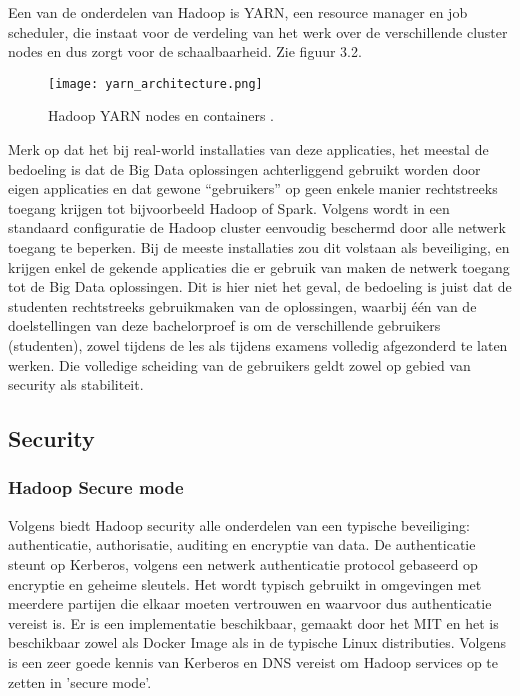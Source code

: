 Een van de onderdelen van Hadoop is YARN, een resource manager en job scheduler, die instaat voor de verdeling van het werk over de verschillende cluster nodes en dus zorgt voor de schaalbaarheid. Zie figuur 3.2.
\newline
\begin{figure}[H]
    \texttt{[image: yarn\_architecture.png]}
    \caption{Hadoop YARN nodes en containers \autocite{Hadoop2023d}.}
\end{figure}

Merk op dat het bij real-world installaties van deze applicaties, het meestal de bedoeling is dat de Big Data oplossingen achterliggend gebruikt worden door eigen applicaties en dat gewone ``gebruikers'' op geen enkele manier rechtstreeks toegang krijgen tot bijvoorbeeld Hadoop of Spark.
\newline
Volgens \autocite{Hadoop2023} wordt in een standaard configuratie de Hadoop cluster eenvoudig beschermd door alle netwerk toegang te beperken. 
Bij de meeste installaties zou dit volstaan als beveiliging, en krijgen enkel de gekende applicaties die er gebruik van maken de netwerk toegang tot de Big Data oplossingen.
\newline
\newline
Dit is hier niet het geval, de bedoeling is juist dat de studenten rechtstreeks gebruikmaken van de oplossingen, waarbij één van de doelstellingen van deze bachelorproef is om de verschillende gebruikers (studenten), zowel tijdens de les als tijdens examens volledig afgezonderd te laten werken. Die volledige scheiding van de gebruikers geldt zowel op gebied van security als stabiliteit.

\subsection{Security}

\subsubsection{Hadoop Secure mode}
Volgens \textcite{Kiran2022} biedt Hadoop security alle onderdelen van een typische beveiliging: authenticatie, authorisatie, auditing en encryptie van data.
De authenticatie steunt op Kerberos, volgens \textcite{Kerberos2023} een netwerk authenticatie protocol gebaseerd op encryptie en geheime sleutels. Het wordt typisch gebruikt in omgevingen met meerdere partijen die elkaar moeten vertrouwen en waarvoor dus authenticatie vereist is. Er is een implementatie beschikbaar, gemaakt door het MIT en het is beschikbaar zowel als Docker Image als in de typische Linux distributies.
\newline
Volgens \textcite{Hadoop2023} is een zeer goede kennis van Kerberos en DNS vereist om Hadoop services op te zetten in 'secure mode'.

